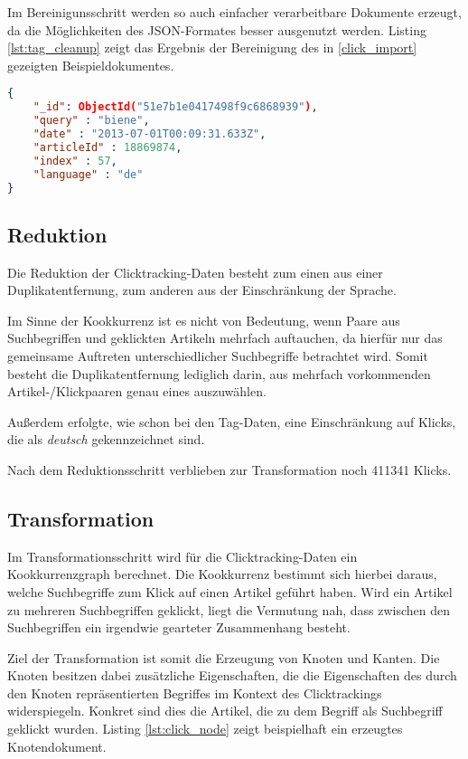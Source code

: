Im Bereinigunsschritt werden so auch einfacher verarbeitbare Dokumente erzeugt, da die Möglichkeiten des JSON-Formates besser ausgenutzt werden. Listing \ref{lst:tag_cleanup} zeigt das Ergebnis der Bereinigung des in \ref{click_import} gezeigten Beispieldokumentes.

\begin{lstlisting}[language=json, label={lst:tag_cleanup}, caption={Bereinigtes Clicktracking-Dokument}]
{
    "_id": ObjectId("51e7b1e0417498f9c6868939"),
    "query" : "biene",
    "date" : "2013-07-01T00:09:31.633Z",
    "articleId" : 18869874,
    "index" : 57,
    "language" : "de"
}
\end{lstlisting}

\subsection{Reduktion}

Die Reduktion der Clicktracking-Daten besteht zum einen aus einer Duplikatentfernung, zum anderen aus der Einschränkung der Sprache.

Im Sinne der Kookkurrenz ist es nicht von Bedeutung, wenn Paare aus Suchbegriffen und geklickten Artikeln mehrfach auftauchen, da hierfür nur das gemeinsame Auftreten unterschiedlicher Suchbegriffe betrachtet wird. Somit besteht die Duplikatentfernung lediglich darin, aus mehrfach vorkommenden Artikel-/Klickpaaren genau eines auszuwählen.

Außerdem erfolgte, wie schon bei den Tag-Daten, eine Einschränkung auf Klicks, die als \emph{deutsch} gekennzeichnet sind.

Nach dem Reduktionsschritt verblieben zur Transformation noch \num{411341} Klicks.

\subsection{Transformation}

Im Transformationsschritt wird für die Clicktracking-Daten ein Kookkurrenzgraph berechnet. Die Kookkurrenz bestimmt sich hierbei daraus, welche Suchbegriffe zum Klick auf einen Artikel geführt haben. Wird ein Artikel zu mehreren Suchbegriffen geklickt, liegt die Vermutung nah, dass zwischen den Suchbegriffen ein irgendwie gearteter Zusammenhang besteht.

Ziel der Transformation ist somit die Erzeugung von Knoten und Kanten. Die Knoten besitzen dabei zusätzliche Eigenschaften, die die Eigenschaften des durch den Knoten repräsentierten Begriffes im Kontext des Clicktrackings widerspiegeln. Konkret sind dies die Artikel, die zu dem Begriff als Suchbegriff geklickt wurden. Listing \ref{lst:click_node} zeigt beispielhaft ein erzeugtes Knotendokument.

